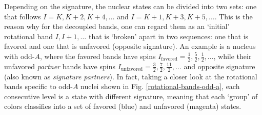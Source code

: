 Depending on the signature, the nuclear states can be divided into two sets: one that follows $I=K,K+2,K+4,\dots$ and $I=K+1,K+3,K+5,\dots$. This is the reason why for the decoupled bands, one can regard them as an `initial' rotational band $I,I+1,\dots$ that is `broken' apart in two sequences: one that is favored and one that is unfavored (opposite signature).
An example is a nucleus with odd-$A$, where the favored bands have spins $I_\text{favored}=\frac{1}{2},\frac{5}{2},\frac{1}{2},\dots$, while their unfavored \emph{partner} bands have spins $I_\text{unfavored}=\frac{3}{2},\frac{7}{2},\frac{11}{2},\dots$ and opposite signature (also known as \emph{signature partners}). In fact, taking a closer look at the rotational bands specific to odd-$A$ nuclei shown in Fig. \ref{rotational-bands-odd-a}, each consecutive level is a state with different signature, meaning that each `group' of colors classifies into a set of favored (blue) and unfavored (magenta) states.

